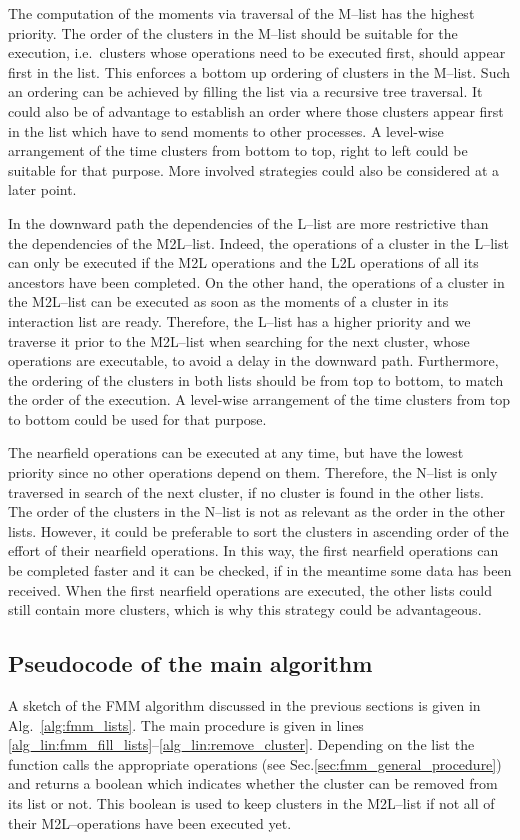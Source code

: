 \documentclass[a4paper,11pt]{article}
\theoremstyle{plain}
\theoremstyle{definition}
\theoremstyle{remark}
\begin{document}
The computation of the moments via traversal of the M--list has the highest priority. The order of the clusters in the M--list should be suitable for the execution, i.e.~clusters whose operations need to be executed first, should appear first in the list. This enforces a bottom up ordering of clusters in the M--list. Such an ordering can be achieved by filling the list via a recursive tree traversal. It could also be of advantage to establish an order where those clusters appear first in the list which have to send moments to other processes. A level-wise arrangement of the time clusters from bottom to top, right to left could be suitable for that purpose. More involved strategies could also be considered at a later point.

In the downward path the dependencies of the L--list are more restrictive than the dependencies of the M2L--list. Indeed, the operations of a cluster in the L--list can only be executed if the M2L operations and the L2L operations of all its ancestors have been completed. On the other hand, the operations of a cluster in the M2L--list can be executed as soon as the moments of a cluster in its interaction list are ready. Therefore, the L--list has a higher priority and we traverse it prior to the M2L--list when searching for the next cluster, whose operations are executable, to avoid a delay in the downward path. Furthermore, the ordering of the clusters in both lists should be from top to bottom, to match the order of the execution. A level-wise arrangement of the time clusters from top to bottom could be used for that purpose.  

The nearfield operations can be executed at any time, but have the lowest priority since no other operations depend on them. Therefore, the N--list is only traversed in search of the next cluster, if no cluster is found in the other lists. The order of the clusters in the N--list is not as relevant as the order in the other lists. However, it could be preferable to sort the clusters in ascending order of the effort of their nearfield operations. In this way, the first nearfield operations can be completed faster and it can be checked, if in the meantime some data has been received. When the first nearfield operations are executed, the other lists could still contain more clusters, which is why this strategy could be advantageous.

\subsection{Pseudocode of the main algorithm} \label{sec:FMM_pseudocode}
A sketch of the FMM algorithm discussed in the previous sections is given in Alg.~\ref{alg:fmm_lists}. The main procedure is given in lines \ref{alg_lin:fmm_fill_lists}--\ref{alg_lin:remove_cluster}. Depending on the list the function  calls the appropriate operations (see Sec.\ref{sec:fmm_general_procedure}) and returns a boolean which indicates whether the cluster can be removed from its list or not. This boolean is used to keep clusters in the M2L--list if not all of their M2L--operations have been executed yet.
\end{document}
